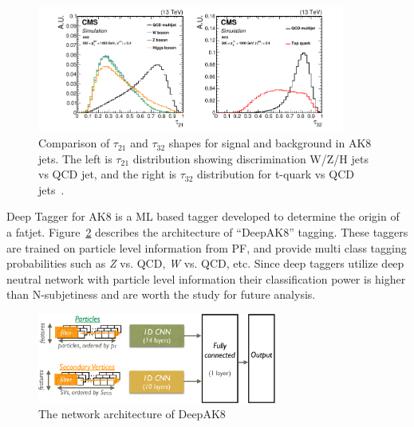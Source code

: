 \begin{figure}[!ht]
  \centering
  \includegraphics[width=0.9\textwidth]{figures/CMS_JME_18_002_Figure_003.pdf}
  \caption[Comparison of \( \tau_{21} \) and \( \tau_{32} \) shapes for signal and background in AK8 jets]%
  {Comparison of \( \tau_{21} \) and \( \tau_{32} \) shapes for signal and background in AK8 jets.
    The left is \( \tau_{21} \) distribution showing discrimination W/Z/H jets
    vs QCD jet, and the right is \( \tau_{32} \) distribution for t-quark vs
    QCD jets~\cite{cms-jme-deep-tagger}.}%
  \label{fig:cms-tau21-tau32-comparison}
\end{figure}

Deep Tagger for AK8 is a \gls{ML} based tagger developed to determine the
origin of a fatjet. Figure~\ref{fig:cms-deepAK8-arch}
describes the architecture of ``DeepAK8'' tagging. These taggers are trained on particle level information
from \gls{PF}, and provide multi class tagging probabilities such as
\textit{Z} vs. \gls{QCD}, \textit{W} vs. \gls{QCD}, etc.
Since deep taggers utilize deep neutral network with particle level
information their classification power is higher than N-subjetiness
and are worth the study for future analysis.

\begin{figure}[!ht]
  \centering
  \includegraphics[width=0.7\textwidth]{figures/CMS_JME_18_002_Figure_009.pdf}
  \caption[The network architecture of DeepAK8]%
  {The network architecture of DeepAK8~\cite{cms-jme-deep-tagger}}%
  \label{fig:cms-deepAK8-arch}
\end{figure}

